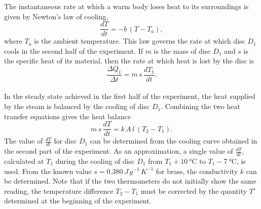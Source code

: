 \documentclass[%
 sor,
 jor,
 amsmath,amssymb,
 reprint,
]{revtex4-2}
\begin{document}
The instantaneous rate at which a warm body loses heat to its surroundings is given by Newton’s law of cooling,
\[
\frac{dT}{dt} = -b\,(T-T_a),
\]
where $T_a$ is the ambient temperature. This law governs the rate at which disc ${D_1}$ cools in the second half of the experiment.
If $m$ is the mass of disc ${D_1}$ and $s$ is the specific heat of its material, then the rate at which heat is lost by the disc is 
\[
\frac{\Delta Q_1}{\Delta t} = m\,s\,\frac{dT_1}{dt}.
\]\\

In the steady state achieved in the first half of the experiment, the heat supplied by the steam is balanced by the cooling of disc ${D_1}$. Combining the two heat transfer equations gives the heat balance
\begin{equation}
m\,s\,\frac{dT}{dt} = k\,A\,l\,\left({T_2}-{T_1}\right).
\end{equation}
The value of $\frac{dT}{dt}$ for disc ${D_1}$ can be determined from the cooling curve obtained in the second part of the experiment. As an approximation, a single value of $\frac{dT}{dt}$, calculated at ${T_1}$ during the cooling of disc ${D_1}$ from ${T_1} + \SI{10}{\celsius}$ to ${T_1} - \SI{7}{\celsius}$, is used.
From the known value $s=\SI{0.380}{J\,g^{-1}\,K^{-1}}$ for brass, the conductivity $k$ can be determined.
Note that if the two thermometers do not initially show the same reading, the temperature difference ${T_2}-{T_1}$ must be corrected by the quantity ${T'}$ determined at the beginning of the experiment.
\end{document}
